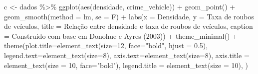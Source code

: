 \documentclass[
]{article}
\newenvironment{Shaded}{\begin{snugshade}}{\end{snugshade}}
\newcommand{\AttributeTok}[1]{\textcolor[rgb]{0.77,0.63,0.00}{#1}}
\newcommand{\DecValTok}[1]{\textcolor[rgb]{0.00,0.00,0.81}{#1}}
\newcommand{\FloatTok}[1]{\textcolor[rgb]{0.00,0.00,0.81}{#1}}
\newcommand{\FunctionTok}[1]{\textcolor[rgb]{0.00,0.00,0.00}{#1}}
\newcommand{\NormalTok}[1]{#1}
\newcommand{\OtherTok}[1]{\textcolor[rgb]{0.56,0.35,0.01}{#1}}
\newcommand{\SpecialCharTok}[1]{\textcolor[rgb]{0.00,0.00,0.00}{#1}}
\newcommand{\StringTok}[1]{\textcolor[rgb]{0.31,0.60,0.02}{#1}}
\begin{document}
\begin{Shaded}
\begin{Highlighting}[]
\NormalTok{c }\OtherTok{\textless{}{-}}\NormalTok{ dados }\SpecialCharTok{\%\textgreater{}\%} 
  \FunctionTok{ggplot}\NormalTok{(}\FunctionTok{aes}\NormalTok{(densidade, crime\_vehicle)) }\SpecialCharTok{+}
  \FunctionTok{geom\_point}\NormalTok{() }\SpecialCharTok{+} 
  \FunctionTok{geom\_smooth}\NormalTok{(}\AttributeTok{method =} \StringTok{\textquotesingle{}lm\textquotesingle{}}\NormalTok{, }\AttributeTok{se =}\NormalTok{ F) }\SpecialCharTok{+}
  \FunctionTok{labs}\NormalTok{(}\AttributeTok{x =} \StringTok{\textquotesingle{}Densidade\textquotesingle{}}\NormalTok{,}
       \AttributeTok{y =} \StringTok{\textquotesingle{}Taxa de roubos de veículos\textquotesingle{}}\NormalTok{,}
       \AttributeTok{title =} \StringTok{\textquotesingle{}Relação entre densidade e taxa de roubos de veículos\textquotesingle{}}\NormalTok{,}
       \AttributeTok{caption =} \StringTok{\textquotesingle{}Construido com base em Donohue e Ayres (2003)\textquotesingle{}}\NormalTok{) }\SpecialCharTok{+} 
  \FunctionTok{theme\_minimal}\NormalTok{() }\SpecialCharTok{+}
  \FunctionTok{theme}\NormalTok{(}\AttributeTok{plot.title=}\FunctionTok{element\_text}\NormalTok{(}\AttributeTok{size=}\DecValTok{12}\NormalTok{, }\AttributeTok{face=}\StringTok{"bold"}\NormalTok{, }\AttributeTok{hjust =} \FloatTok{0.5}\NormalTok{),}
        \AttributeTok{legend.text=}\FunctionTok{element\_text}\NormalTok{(}\AttributeTok{size=}\DecValTok{8}\NormalTok{),}
        \AttributeTok{axis.text=}\FunctionTok{element\_text}\NormalTok{(}\AttributeTok{size=}\DecValTok{8}\NormalTok{),}
        \AttributeTok{axis.title =} \FunctionTok{element\_text}\NormalTok{(}\AttributeTok{size =} \DecValTok{10}\NormalTok{, }\AttributeTok{face=}\StringTok{"bold"}\NormalTok{),}
        \AttributeTok{legend.title =} \FunctionTok{element\_text}\NormalTok{(}\AttributeTok{size =} \DecValTok{10}\NormalTok{),}
\NormalTok{        )}
  

\end{Highlighting}
\end{Shaded}
\end{document}
